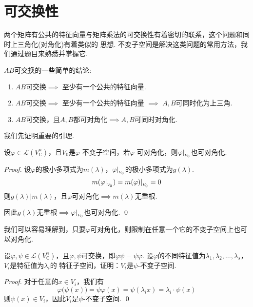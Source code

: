 \section{可交换性}

两个矩阵有公共的特征向量与矩阵乘法的可交换性有着密切的联系，这个问题和同时上三角化(对角化)有着类似的
思想. 不变子空间是解决这类问题的常用方法，我们通过题目来熟悉并掌握它.


$AB$可交换的一些简单的结论:
\begin{enumerate}
	\item $AB$可交换$\implies $ 至少有一个公共的特征向量.
	\item $AB$可交换$\implies $ 至少有一个公共的特征向量 $\implies $  $A,B$可同时化为上三角.
	\item $AB$可交换，且$A,B$都可对角化$\implies A,B$可同时对角化.
\end{enumerate}

我们先证明重要的引理.

\begin{lemma}[限制的可对角化]
	设$\varphi \in \mathscr{L}(V_{\mathbb{C}}^n)$，且$V_0$是$\varphi$-不变子空间，若$\varphi$
	可对角化，则$\varphi |_{_{V_0}}$也可对角化.
\end{lemma}

\begin{proof}
	设$\varphi$的极小多项式为$m(\lambda)$，$\varphi |_{_{V_0}}$的极小多项式为$g(\lambda)$.
	$$
		m(\varphi |_{_{V_0}})=m(\varphi)|_{_{V_0}}=0
	$$
	则$g(\lambda) | m(\lambda)$，且$\varphi$可对角化$\implies $$m(\lambda)$无重根.

	因此$g(\lambda)$无重根$\implies $$\varphi |_{_{V_0}}$也可对角化. \qed
\end{proof}

\begin{remark}
	我们可以容易理解到，只要$\varphi$可对角化，则限制在任意一个它的不变子空间上也可以对角化.
\end{remark}

\begin{lemma}[可交换的不变子空间]
	设$\varphi, \psi \in \mathscr{L}(V_{\mathbb{C}}^n)$，且$\varphi, \psi$可交换，即$\varphi \psi = \psi \varphi$.
	设$\varphi$的不同特征值为$\lambda_1,\lambda_2,\dots,\lambda_s$，$V_i$是特征值为$\lambda_i$的
	特征子空间，证明：$V_i$是$\psi$-不变子空间.
\end{lemma}

\begin{proof}
	对于任意的$x \in V_i$，我们有
	$$
		\varphi \bigl(\psi (x) \bigr)= \psi \varphi (x) = \psi (\lambda_i x) = \lambda_i \cdot \psi(x)
	$$
	则$\psi(x) \in V_i$，因此$V_i$是$\psi$-不变子空间. \qed{}
\end{proof}

